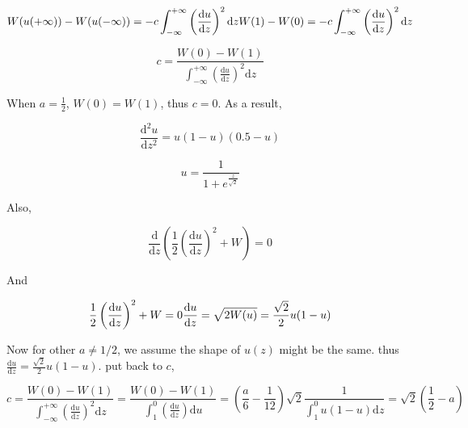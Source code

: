 \documentclass[
]{article}
\begin{document}
\begin{equation*}
W(u(+\infty))-W(u(-\infty)) =- c \int_{-\infty}^{+\infty} \left( \frac{\mathrm{d} u}{\mathrm{d} z} \right)^2 \mathrm{d}z\\
W(1)-W(0) =- c \int_{-\infty}^{+\infty} \left( \frac{\mathrm{d} u}{\mathrm{d} z} \right)^2 \mathrm{d}z\\
\end{equation*}

\begin{equation*}
c = \frac{W(0)-W(1)}{\int_{-\infty}^{+\infty} \left( \frac{\mathrm{d} u}{\mathrm{d} z} \right)^2 \mathrm{d}z}
\end{equation*}

When $a = \frac{1}{2}$, $W(0)=W(1)$, thus $c=0$. As a result,

\begin{equation*}
\frac{\mathrm{d}^2 u}{\mathrm{d} z^2} = u(1-u)(0.5-u)
\end{equation*}

\begin{equation*}
u = \frac{1}{1+e^{\frac{z}{\sqrt{2}}}}
\end{equation*}

Also,

\begin{equation*}
\frac{\mathrm{d}}{\mathrm{d}z} \left( \frac{1}{2}\left( \frac{\mathrm{d} u}{\mathrm{d} z} \right)^2  + W \right) = 0
\end{equation*}

And

\begin{equation*}
\frac{1}{2}\left( \frac{\mathrm{d} u}{\mathrm{d} z} \right)^2  + W = 0\\
\frac{\mathrm{d} u}{\mathrm{d} z} = \sqrt{2W(u)} = \frac{\sqrt{2}}{2}u(1-u)
\end{equation*}

Now for other $a\neq1/2$, we assume the shape of $u(z)$ might be the
same. thus
$\frac{\mathrm{d} u}{\mathrm{d} z} = \frac{\sqrt{2}}{2}u(1-u)$. put
back to $c$,

\begin{equation*}
c = \frac{W(0)-W(1)}{\int_{-\infty}^{+\infty} \left( \frac{\mathrm{d} u}{\mathrm{d} z} \right)^2 \mathrm{d}z} 
=\frac{W(0)-W(1)}{\int_{1}^{0} \left( \frac{\mathrm{d} u}{\mathrm{d} z} \right) \mathrm{d}u} 
=(\frac{a}{6} - \frac{1}{12})\sqrt{2} \frac{1}{\int_{1}^{0} u(1-u) \mathrm{d}z} = \sqrt{2}(\frac{1}{2} - a)
\end{equation*}
\end{document}
